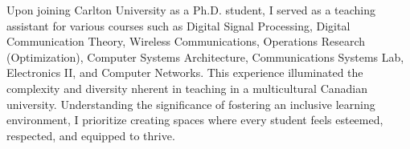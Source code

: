 \documentclass[11pt]{article}
\begin{document}






Upon joining Carlton University as a Ph.D. student, I served as a teaching assistant for various courses such as Digital Signal Processing, Digital Communication Theory, Wireless Communications, Operations Research (Optimization), Computer Systems Architecture, Communications Systems Lab, Electronics II, and Computer Networks. This experience illuminated the complexity and diversity nherent in teaching in a multicultural Canadian university. %
Understanding the significance of fostering an inclusive learning environment, I prioritize creating spaces where every student feels esteemed, respected, and equipped to thrive.
\end{document}
